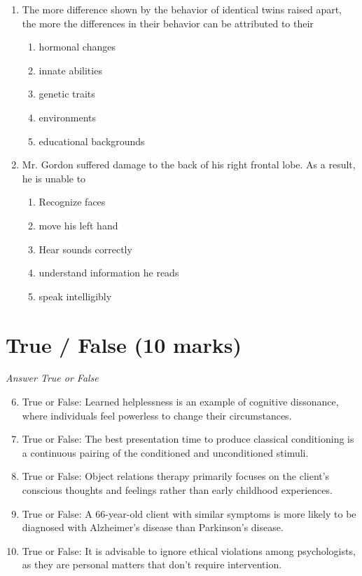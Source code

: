 \documentclass[12pt]{article}
\begin{document}
\begin{enumerate}[label=\arabic*.]
\item The more difference shown by the behavior of identical twins raised apart, the more the differences in their behavior can be attributed to their
\begin{enumerate}[label=(\alph*)]
    \item hormonal changes
    \item innate abilities
    \item genetic traits
    \item environments
    \item educational backgrounds
\end{enumerate}
\item Mr. Gordon suffered damage to the back of his right frontal lobe. As a result, he is unable to
\begin{enumerate}[label=(\alph*)]
    \item Recognize faces
    \item move his left hand
    \item Hear sounds correctly
    \item understand information he reads
    \item speak intelligibly
\end{enumerate}
\end{enumerate}

\section*{True / False (10 marks)}
\textit{Answer True or False}
\begin{enumerate}[label=\arabic*.]
\setcounter{enumi}{5}
\item True or False: Learned helplessness is an example of cognitive dissonance, where individuals feel powerless to change their circumstances.
\item True or False: The best presentation time to produce classical conditioning is a continuous pairing of the conditioned and unconditioned stimuli.
\item True or False: Object relations therapy primarily focuses on the client's conscious thoughts and feelings rather than early childhood experiences.
\item True or False: A 66-year-old client with similar symptoms is more likely to be diagnosed with Alzheimer's disease than Parkinson's disease.
\item True or False: It is advisable to ignore ethical violations among psychologists, as they are personal matters that don't require intervention.
\end{enumerate}
\end{document}
